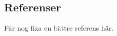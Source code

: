 \subsection{Referenser}
\vspace{-15mm}
\renewcommand{\refname}{}
\begin{thebibliography}{9}
\footnotesize

Får nog fixa en bättre referens här.


\end{thebibliography}
